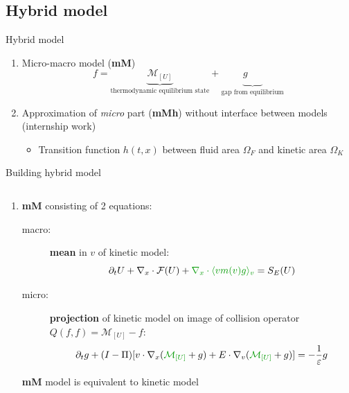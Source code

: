 \documentclass{beamer}
\begin{document}
  \subsection{Hybrid model}
  \begin{frame}{Hybrid model}
    \begin{enumerate}
      \item Micro-macro model (\textbf{mM})
        $$
          f = \underbrace{\mathcal{M}_{[U]}}_{\text{thermodynamic equilibrium state}} + \underbrace{g_{\phantom{[U]}}}_{\text{gap from equilibrium}}
        $$
      \item Approximation of \emph{micro} part (\textbf{mMh}) without interface between models (internship work)
        \begin{itemize}
          \item Transition function $h(t,x)$ between fluid area $\Omega_F$ and kinetic area $\Omega_K$
        \end{itemize}
    \end{enumerate}
  \end{frame}

  \begin{frame}{Building hybrid model}
    \begin{columns}
        \hspace*{0cm}
      \begin{column}{1.1\textwidth}
        \begin{enumerate}
          \setcounter{enumi}{0}
          \item \textbf{mM} consisting of 2 equations:
            \begin{description}
              \item[macro:] \textbf{mean} in $v$ of kinetic model:
              $$
                \partial_t U + \nabla_x\cdot\mathcal{F}(U) + {\color{dgreen}\nabla_x\cdot\langle vm(v)g \rangle_v} = S_E(U)
              $$

              \item[micro:] \textbf{projection} of kinetic model on image of collision operator $Q(f,f) = \mathcal{M}_{[U]} - f$:
              $$
                \partial_t g + (I-\Pi)[ v\cdot\nabla_x ({\color{dgreen}\mathcal{M}_{[U]}}+g) + E\cdot\nabla_v ({\color{dgreen}\mathcal{M}_{[U]}}+g) ] = -\frac{1}{\varepsilon}g
              $$
            \end{description}

            \textbf{mM} model is equivalent to kinetic model
        \end{enumerate}
      \end{column}
    \end{columns}
  \end{frame}
\end{document}
